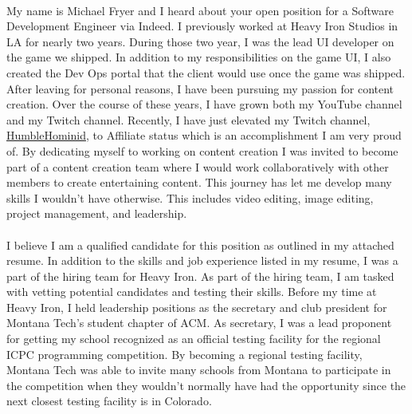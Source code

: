 \paragraph{}
My name is Michael Fryer and I heard about your open position for a Software Development Engineer via Indeed. I previously worked at Heavy Iron Studios in LA for nearly two years. During those two year, I was the lead UI developer on the game we shipped. In addition to my responsibilities on the game UI, I also created the Dev Ops portal that the client would use once the game was shipped. After leaving for personal reasons, I have been pursuing my passion for content creation. Over the course of these years, I have grown both my YouTube channel and my Twitch channel. Recently, I have just elevated my Twitch channel, \href{https://twitch.tv/HumbleHominid}{HumbleHominid}, to Affiliate status which is an accomplishment I am very proud of. By dedicating myself to working on content creation I was invited to become part of a content creation team where I would work collaboratively with other members to create entertaining content. This journey has let me develop many skills I wouldn't have otherwise. This includes video editing, image editing, project management, and leadership.

\paragraph{}
I believe I am a qualified candidate for this position as outlined in my attached resume. In addition to the skills and job experience listed in my resume, I was a part of the hiring team for Heavy Iron. As part of the hiring team, I am tasked with vetting potential candidates and testing their skills. Before my time at Heavy Iron, I held leadership positions as the secretary and club president for Montana Tech's student chapter of ACM. As secretary, I was a lead proponent for getting my school recognized as an official testing facility for the regional ICPC programming competition. By becoming a regional testing facility, Montana Tech was able to invite many schools from Montana to participate in the competition when they wouldn't normally have had the opportunity since the next closest testing facility is in Colorado.